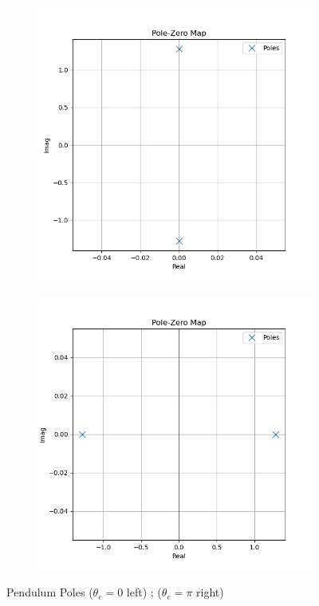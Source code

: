 \begin{figure}[H]
\centering
\begin{subfigure}[b]{0.48\textwidth}
\centering
\includegraphics[width=\linewidth]{Figures/pendulum_poles_stable.png}
\end{subfigure}
\hfill
\begin{subfigure}[b]{0.48\textwidth}
\centering
\includegraphics[width=\linewidth]{Figures/pendulum_poles_unstable.png}
\end{subfigure}
\caption{Pendulum Poles ($\theta_e=0$ left) ; ($\theta_e=\pi$ right)}
\label{f:pendulum_poles}
\end{figure}
